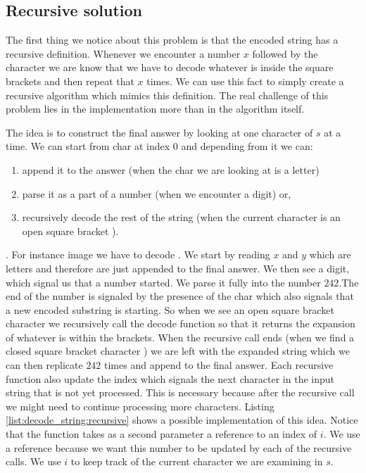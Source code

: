 \subsection{Recursive solution}
\label{decode_string:sec:recursive}
The first thing we notice about this problem is that the encoded string has a recursive definition. 
Whenever we encounter a number $x$ followed by the \inline{'['} character we are know that we have to 
decode whatever is inside the square brackets and then repeat that $x$ times. 
We can use this fact to simply create a recursive algorithm which mimics this definition. The real challenge of this problem
lies in the implementation more than in the algorithm itself.

The idea is to construct the final answer by looking at one character of $s$ at a time. 
We can start from char at index $0$ and depending from it we can:
\begin{enumerate}
	\item append it to the answer (when the char we are looking at is a letter)
	\item parse it as a part of a number (when we encounter a digit) or,
	\item recursively decode the rest of the string (when the current character is an open square bracket \inline{'['}).
\end{enumerate}.
For instance image we have to decode . 
We start by reading $x$ and $y$ which are letters and therefore are just appended to the final answer.
We then see a digit, which signal us that a number started.  We parse it fully into the number $242$.The end of the number is signaled by the presence of the char \inline{'['}
which also signals that a new encoded substring is starting. 
So when we see an open square bracket character we recursively call the decode function so that it returns the expansion of whatever is within the brackets. 
When the recursive call ends (when we find a closed square bracket character \inline{']'})
 we are left with the expanded string which we can then replicate $242$ times and append to the final answer. 
Each recursive function also update the index which signals the next character in the input string that is not yet processed. 
This is necessary because after the recursive call we might need to continue processing more characters.
Listing \ref{list:decode_string:recursive} shows a possible implementation of this idea.
Notice that the function  takes as a second parameter a reference to an index of $i$.
We use a reference because we want this number to be updated by each of the recursive calls.
We use $i$ to keep track of the current character we are examining in $s$.


